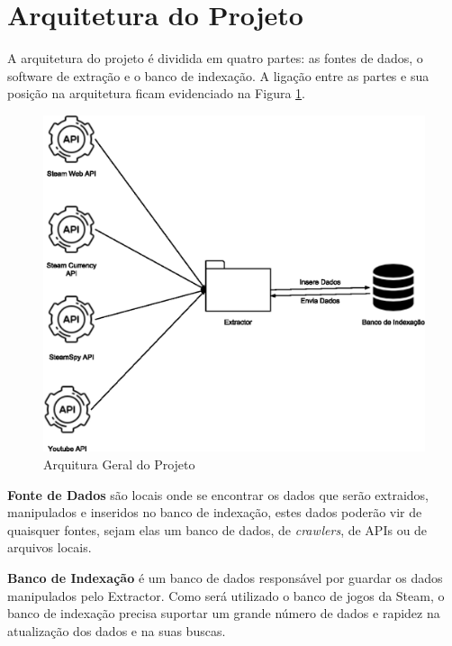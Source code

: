 \section{Arquitetura do Projeto}
A arquitetura do projeto é dividida em quatro partes: as fontes de dados, o software de extração e o banco de indexação. A ligação entre as partes e sua posição na arquitetura ficam evidenciado na Figura \ref{image:arquitetura}.
\begin{figure} [H]
\centering
\includegraphics[scale=0.5]{figuras/arquiteturaProjeto.eps}
\caption{Arquitura Geral do Projeto}
\label{image:arquitetura}
\end{figure}
\textbf{Fonte de Dados} são locais onde se encontrar os dados que serão extraidos, manipulados e inseridos no banco de indexação, estes dados poderão vir de quaisquer fontes, sejam elas um banco de dados, de \textit{crawlers}, de APIs ou de arquivos locais.

\textbf{Banco de Indexação} é um banco de dados responsável por guardar os dados manipulados pelo Extractor. Como será utilizado o banco de jogos da Steam, o banco de indexação precisa suportar um grande número de dados e rapidez na atualização dos dados e na suas buscas.

